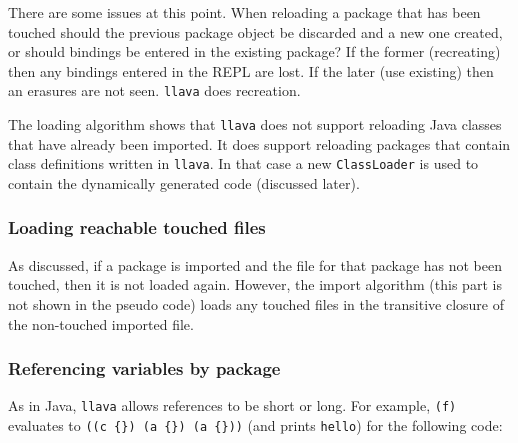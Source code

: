 \documentclass{acm_proc_article-sp}
\begin{document}
There are some issues at this point.  When reloading a package that
has been touched should the previous package object be discarded and a
new one created, or should bindings be entered in the existing
package?  If the former (recreating) then any bindings entered in the
REPL are lost.  If the later (use existing) then an erasures are not
seen.  {\tt llava} does recreation.

The loading algorithm shows that {\tt llava} does not support
reloading Java classes that have already been imported.  It does
support reloading packages that contain class definitions written in
{\tt llava}.  In that case a new {\tt ClassLoader} is used to contain
the dynamically generated code (discussed later).

\subsubsection{Loading reachable touched files}

As discussed, if a package is imported and the file for that package
has not been touched, then it is not loaded again.  However, the
import algorithm (this part is not shown in the pseudo code) loads any
touched files in the transitive closure of the non-touched imported
file.

\subsubsection{Referencing variables by package}

As in Java, {\tt llava} allows references to be short or long.  For
example, {\tt (f)} evaluates to \verb+((c {}) (a {}) (a {}))+ (and
prints {\tt hello}) for the following code:
\end{document}
